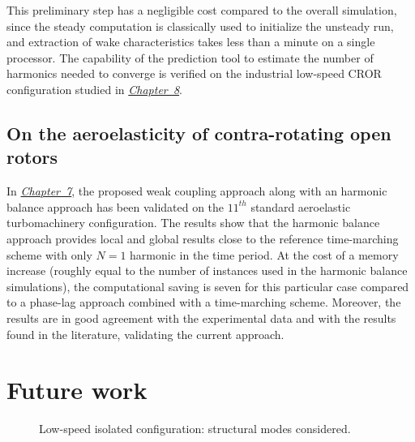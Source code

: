 This preliminary step has a negligible cost compared to the overall 
simulation, since the steady computation is classically used to initialize 
the unsteady run, and extraction of wake characteristics takes 
less than a minute on a single processor. The capability of the
prediction tool to estimate the number of harmonics needed
to converge is verified on the industrial low-speed CROR configuration
studied in \hyperref[cha:dream_ls_isolated]{\emph{Chapter~8}}.

\subsection*{On the aeroelasticity of contra-rotating open rotors}

In \hyperref[cha:stcf11]{\emph{Chapter~7}}, 
the proposed weak coupling approach along with
an harmonic balance approach has been
validated on the $11^{th}$ standard aeroelastic turbomachinery
configuration.
The results show that the harmonic balance approach provides local
and global results close to the reference time-marching scheme 
with only $N=1$ harmonic in the time period. At the cost of a memory
increase (roughly equal to the number of instances used in the harmonic balance
simulations), the computational saving is seven for this
particular case compared to a phase-lag approach combined
with a time-marching scheme. Moreover, the results are
in good agreement with the experimental data and with the results
found in the literature, validating the current approach.






\section*{Future work}

\begin{figure}[htp]
  \centering
  \caption{Low-speed isolated configuration: structural modes considered.}
  \label{fig:hera3_perspectives}
\end{figure}
